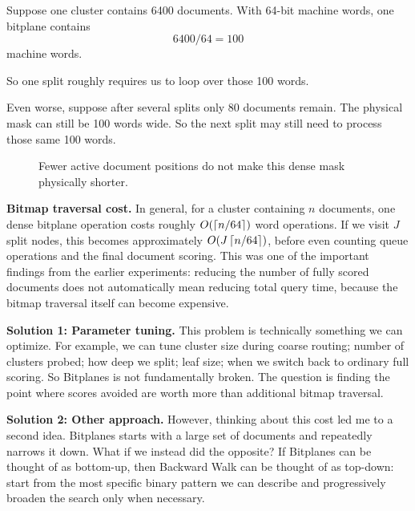 Suppose one cluster contains 6400 documents. With 64-bit machine words, one bitplane contains
\[
6400/64=100
\]
machine words.

So one split roughly requires us to loop over those 100 words.

Even worse, suppose after several splits only 80 documents remain. The physical mask can
still be 100 words wide. So the next split may still need to process those same 100 words.

\begin{figure}[H]\centering
{}
\caption{Fewer active document positions do not make this dense mask physically shorter.}
\end{figure}

\textbf{Bitmap traversal cost.} In general, for a cluster containing $n$ documents, one dense
bitplane operation costs roughly $O(\left\lceil n/64\right\rceil)$ word operations. If we visit $J$ split
nodes, this becomes approximately $O(J\left\lceil n/64\right\rceil)$, before even counting queue operations
and the final document scoring. This was one of the important findings from the earlier
experiments: reducing the number of fully scored documents does not automatically mean
reducing total query time, because the bitmap traversal itself can become expensive.

\textbf{Solution 1: Parameter tuning.} This problem is technically something we can optimize.
For example, we can tune cluster size during coarse routing; number of clusters probed;
how deep we split; leaf size; when we switch back to ordinary full scoring. So Bitplanes
is not fundamentally broken. The question is finding the point where scores avoided are
worth more than additional bitmap traversal.

\textbf{Solution 2: Other approach.} However, thinking about this cost led me to a second idea.
Bitplanes starts with a large set of documents and repeatedly narrows it down. What if we
instead did the opposite? If Bitplanes can be thought of as bottom-up, then Backward Walk
can be thought of as top-down: start from the most specific binary pattern we can describe
and progressively broaden the search only when necessary.

